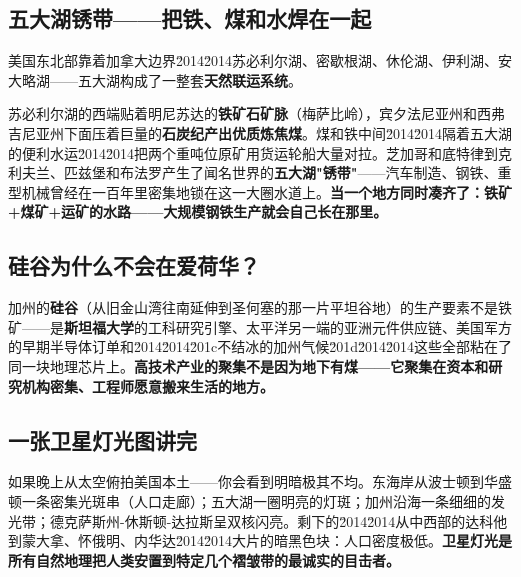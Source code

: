 \documentclass[a4paper,12pt]{ctexart}
\begin{document}
\subsection*{五大湖锈带——把铁、煤和水焊在一起}

美国东北部靠着加拿大边界\u2014\u2014苏必利尔湖、密歇根湖、休伦湖、伊利湖、安大略湖——五大湖构成了一整套\textbf{天然联运系统}。

苏必利尔湖的西端贴着明尼苏达的\textbf{铁矿石矿脉}（梅萨比岭），宾夕法尼亚州和西弗吉尼亚州下面压着巨量的\textbf{石炭纪产出优质炼焦煤}。煤和铁中间\u2014\u2014隔着五大湖的便利水运\u2014\u2014把两个重吨位原矿用货运轮船大量对拉。芝加哥和底特律到克利夫兰、匹兹堡和布法罗产生了闻名世界的\textbf{五大湖"锈带"}——汽车制造、钢铁、重型机械曾经在一百年里密集地锁在这一大圈水道上。\textbf{当一个地方同时凑齐了：铁矿+煤矿+运矿的水路——大规模钢铁生产就会自己长在那里。}

\subsection*{硅谷为什么不会在爱荷华？}

加州的\textbf{硅谷}（从旧金山湾往南延伸到圣何塞的那一片平坦谷地）的生产要素不是铁矿——是\textbf{斯坦福大学}的工科研究引擎、太平洋另一端的亚洲元件供应链、美国军方的早期半导体订单和\u2014\u2014\u201c不结冰的加州气候\u201d\u2014\u2014这些全部粘在了同一块地理芯片上。\textbf{高技术产业的聚集不是因为地下有煤——它聚集在资本和研究机构密集、工程师愿意搬来生活的地方。}

\subsection*{一张卫星灯光图讲完}

如果晚上从太空俯拍美国本土——你会看到明暗极其不均。东海岸从波士顿到华盛顿一条密集光斑串（人口走廊）；五大湖一圈明亮的灯斑；加州沿海一条细细的发光带；德克萨斯州-休斯顿-达拉斯呈双核闪亮。剩下的\u2014\u2014从中西部的达科他到蒙大拿、怀俄明、内华达\u2014\u2014大片的暗黑色块：人口密度极低。\textbf{卫星灯光是所有自然地理把人类安置到特定几个褶皱带的最诚实的目击者。}

\end{document}
